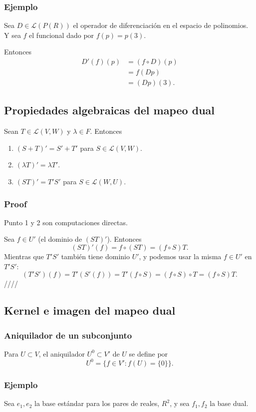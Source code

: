 \documentclass{article}
\begin{document}
\subsubsection{Ejemplo}
Sea $D\in\mathcal{L}(P(R))$ el operador de diferenciación
en el espacio de polinomios. Y sea $f$ el funcional dado por
$f(p) = p(3)$.

Entonces \begin{align*}
    D'(f)(p)&=(f\circ D)(p) \\
    &= f(Dp)\\
    &= (Dp)(3).
\end{align*}

\subsection{Propiedades algebraicas del mapeo dual}
Sean $T\in\mathcal{L}(V,W)$ y $\lambda\in F$. Entonces
\begin{enumerate}
    \item $(S+T)' = S' + T'$ para $S\in\mathcal{L}(V,W)$.
    \item $(\lambda T)' = \lambda T'$.
    \item $(ST)'=T'S'$ para $S\in\mathcal{L}(W,U)$.
\end{enumerate}
\subsubsection*{Proof}
Punto 1 y 2 son computaciones directas.

Sea $f\in U'$ (el dominio de $(ST)'$). Entonces
$$(ST)'(f) = f\circ (ST) = (f\circ S)T.$$
Mientras que $T'S'$ también tiene dominio $U'$, y podemos usar la
misma $f\in U'$ en $T'S'$:
$$(T'S')(f)=T'(S'(f))=T'(f\circ S)=(f\circ S)\circ T= (f\circ S)T.$$
\hfill ////

\subsection{Kernel e imagen del mapeo dual}
\subsubsection{Aniquilador de un subconjunto}
Para $U\subset V$, el aniquilador $U^0\subset V'$ de $U$ se define por
$$U^0 = \{f\in V': f(U) = \{0\}\}.$$

\subsubsection{Ejemplo}
Sea $e_1,e_2$ la base estándar para los pares de reales, $R^2$, y sea
$f_1,f_2$ la base dual.
\end{document}

